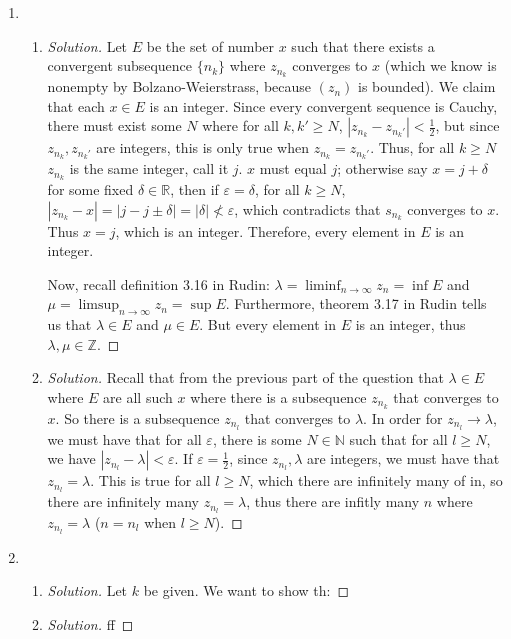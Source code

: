 \documentclass{article}
\newcommand{\N}{{\mathbb N}}
\newcommand{\Z}{{\mathbb Z}}
\newcommand{\R}{{\mathbb R}}
\newcommand{\ep}{{\varepsilon}}
\begin{document}
\begin{enumerate}
	\item
	\begin{enumerate}
		\item \begin{proof}[Solution]\let\qed\relax
			Let $E$ be the set of number $x$ such that
			there exists a convergent subsequence $\{n_k\}$ where
			$z_{n_k}$ converges to $x$
			(which we know is nonempty by Bolzano-Weierstrass,
			because $(z_n)$ is bounded).
			We claim that each $x \in E$ is an integer.
			Since every convergent sequence is Cauchy,
			there must exist some $N$ where for all $k,k' \geq N$,
			$|z_{n_k} - z_{n_k'}| < \frac{1}{2}$,
			but since $z_{n_k}, z_{n_k'}$ are integers,
			this is only true when $z_{n_k} = z_{n_k'}$.
			Thus, for all $k \geq N$ $z_{n_k}$ is the same integer, call it $j$.
			$x$ must equal $j$;
			otherwise say $x = j + \delta$ for some fixed $\delta\in\R$,
			then if $\ep = \delta$, for all $k \geq N$,
			$|z_{n_k} - x| = |j - j \pm \delta| = |\delta| \not< \ep$,
			which contradicts that $s_{n_k}$ converges to $x$.
			Thus $x = j$, which is an integer.
			Therefore, every element in $E$ is an integer.

			Now, recall definition 3.16 in Rudin:
			$\lambda = \liminf_{n \to \infty}z_n = \inf{E}$ and
			$\mu = \limsup_{n\to\infty}z_n = \sup{E}$.
			Furthermore, theorem 3.17 in Rudin tells us that
			$\lambda \in E$ and $\mu \in E$.
			But every element in $E$ is an integer, thus
			$\lambda,\mu \in \Z$.
		\end{proof}
		\item \begin{proof}[Solution]\let\qed\relax
			Recall that from the previous part of the question
			that $\lambda \in E$ where $E$
			are all such $x$ where there is a subsequence
			$z_{n_k}$ that converges to $x$.
			So there is a subsequence $z_{n_l}$
			that converges to $\lambda$.
			In order for $z_{n_l} \to \lambda$,
			we must have that for all $\ep$,
			there is some $N\in\N$ such that for all $l \geq N$,
			we have $|z_{n_l} - \lambda| < \ep$.
			If $\ep = \frac{1}{2}$,
			since $z_{n_l}, \lambda$ are integers,
			we must have that $z_{n_l} = \lambda$.
			This is true for all $l \geq N$,
			which there are infinitely many of in,
			so there are infinitely many $z_{n_l} = \lambda$,
			thus there are infitly many $n$ where $z_{n_l} = \lambda$
			($n = n_l$ when $l \geq N$).
		\end{proof}
	\end{enumerate}
	\item
	\begin{enumerate}
		\item \begin{proof}[Solution]\let\qed\relax
			Let $k$ be given.
			We want to show th: 
		\end{proof}
		\item \begin{proof}[Solution]\let\qed\relax
			ff
		\end{proof}
	\end{enumerate}
\end{enumerate}
\clearpage
\end{document}
